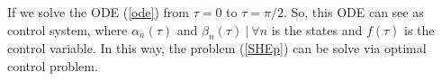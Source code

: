 
If we solve the ODE (\ref{ode}) from $\tau=0$ to $\tau=\pi/2$.
%
So, this ODE can see as control system, where $\alpha_n(\tau)$ and $\beta_n(\tau) \ | \ \forall n $ is the states and $f(\tau)$ is the control variable.
In this way, the problem (\ref{SHEp}) can be solve via optimal control problem. 